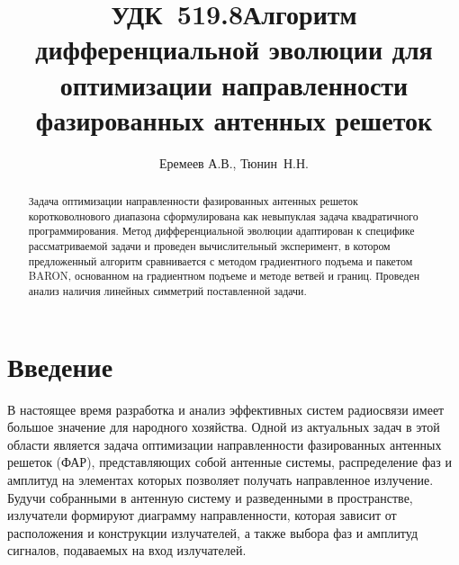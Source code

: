 \documentclass{llncs}
\begin{document}
\mainmatter              %
%
\title{\hbox{\normalsize УДК 519.8}Алгоритм дифференциальной эволюции для оптимизации направленности фазированных антенных решеток}
%
\titlerunning{ }  %
%
\author{Еремеев А.В., Тюнин~Н.Н.}
%
%
%

\maketitle              %

\begin{abstract}
Задача оптимизации направленности фазированных антенных решеток коротковолнового диапазона сформулирована как невыпуклая задача квадратичного программирования.
Метод дифференциальной эволюции адаптирован к специфике рассматриваемой задачи и проведен вычислительный эксперимент, в котором предложенный алгоритм сравнивается с методом градиентного подъема и пакетом BARON, основанном на градиентном подъеме и методе ветвей и границ. Проведен анализ наличия линейных симметрий поставленной задачи.

\end{abstract}

\thispagestyle{empty}
\section*{Введение}
В настоящее время разработка и анализ эффективных систем радиосвязи имеет большое значение для народного хозяйства. Одной из актуальных задач в этой области является задача оптимизации направленности фазированных антенных решеток (ФАР), представляющих собой антенные системы, распределение фаз и амплитуд на элементах которых позволяет получать направленное излучение.
Будучи собранными в антенную систему и разведенными в пространстве, излучатели формируют диаграмму направленности, которая зависит от расположения и конструкции излучателей, а также выбора фаз и амплитуд сигналов, подаваемых на вход излучателей.
\end{document}
